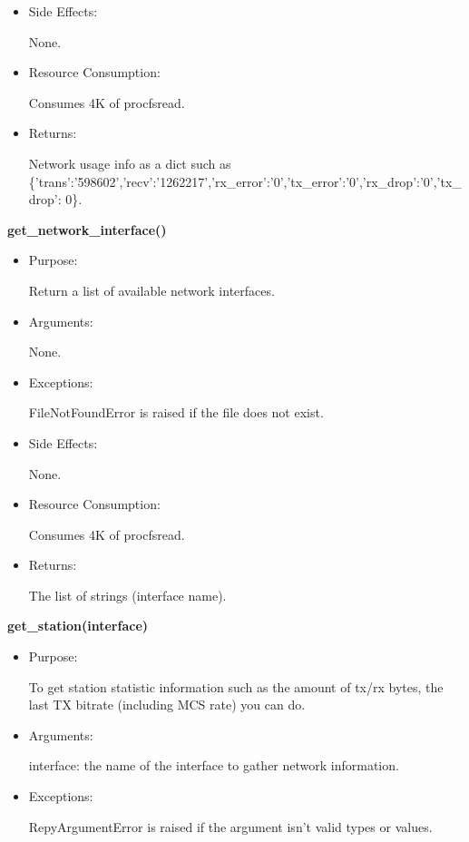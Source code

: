 {\begin{itemize}
\item Side Effects:

None.

\item Resource Consumption:

Consumes 4K of procfsread.

\item Returns:

Network usage info as a dict such as \{'trans':'598602','recv':'1262217','rx\_error':'0','tx\_error':'0','rx\_drop':'0','tx\_drop': 0\}.
\end{itemize}

\textbf{get\_network\_interface()}
\begin{itemize}
\item Purpose:

Return a list of available network interfaces.

\item Arguments:

None.

\item Exceptions:

FileNotFoundError is raised if the file does not exist.

\item Side Effects:

None.

\item Resource Consumption:

Consumes 4K of procfsread.

\item Returns:

The list of strings (interface name).

\end{itemize}

\textbf{get\_station(interface)}
\begin{itemize}
\item Purpose:

To get station statistic information such as the amount of tx/rx bytes, the last TX bitrate (including MCS rate) you can do.

\item Arguments:

interface: the name of the interface to gather network information.

\item Exceptions:

RepyArgumentError is raised if the argument isn't valid types or values.


\end{itemize}}
